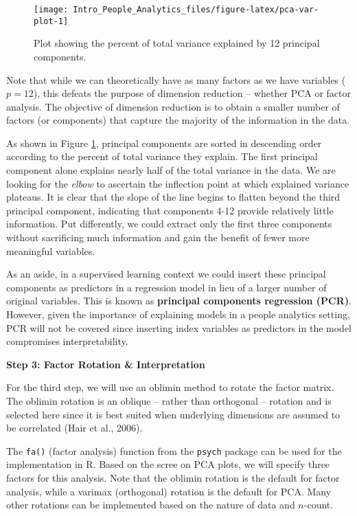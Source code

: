 \documentclass[
]{book}
\begin{document}
\begin{figure}

{\centering \texttt{[image: Intro\_People\_Analytics\_files/figure-latex/pca-var-plot-1]} 

}

\caption{Plot showing the percent of total variance explained by 12 principal components.}\label{fig:pca-var-plot}
\end{figure}

Note that while we can theoretically have as many factors as we have variables (\(p = 12\)), this defeats the purpose of dimension reduction -- whether PCA or factor analysis. The objective of dimension reduction is to obtain a smaller number of factors (or components) that capture the majority of the information in the data.

As shown in Figure \ref{fig:pca-var-plot}, principal components are sorted in descending order according to the percent of total variance they explain. The first principal component alone explains nearly half of the total variance in the data. We are looking for the \emph{elbow} to ascertain the inflection point at which explained variance plateaus. It is clear that the slope of the line begins to flatten beyond the third principal component, indicating that components 4-12 provide relatively little information. Put differently, we could extract only the first three components without sacrificing much information and gain the benefit of fewer more meaningful variables.

As an aside, in a supervised learning context we could insert these principal components as predictors in a regression model in lieu of a larger number of original variables. This is known as \textbf{principal components regression (PCR)}. However, given the importance of explaining models in a people analytics setting, PCR will not be covered since inserting index variables as predictors in the model compromises interpretability.

\textbf{Step 3: Factor Rotation \& Interpretation}

For the third step, we will use an oblimin method to rotate the factor matrix. The oblimin rotation is an oblique -- rather than orthogonal -- rotation and is selected here since it is best suited when underlying dimensions are assumed to be correlated (Hair et al., 2006).

The \texttt{fa()} (factor analysis) function from the \texttt{psych} package can be used for the implementation in R. Based on the scree on PCA plots, we will specify three factors for this analysis. Note that the oblimin rotation is the default for factor analysis, while a varimax (orthogonal) rotation is the default for PCA. Many other rotations can be implemented based on the nature of data and \(n\)-count.
\end{document}
